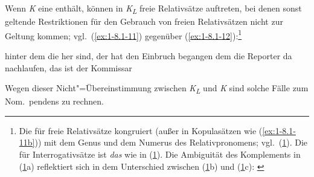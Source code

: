 \documentclass[output=paper]{langsci/langscibook}
\begin{document}
Wenn \textit{K} eine  enthält, können in \textit{K\textsubscript{L}} freie Relativsätze auftreten, bei
denen sonst geltende Restriktionen für den Gebrauch von freien Relativsätzen nicht
zur Geltung kommen; vgl.\ (\ref{ex:1-8.1-11}) gegenüber
(\ref{ex:1-8.1-12}):\footnote{%
	Die  für freie Relativsätze
  kongruiert (außer in Kopulasätzen wie (\ref{ex:1-8.1-11b})) mit dem
  Genus und dem Numerus des Relativpronomens;
  vgl.\ (\ref{ex:1-fn33i}). Die  für Interrogativsätze ist
  \textit{das} wie in (\ref{ex:1-fn33ii}). Die Ambiguität des
  Komplements in (\ref{ex:1-fn33iii}a) reflektiert sich in dem
  Unterschied zwischen (\ref{ex:1-fn33iii}b) und
  (\ref{ex:1-fn33iii}c):
  \eal
  \label{ex:1-fn33i}%
  \zlmid
  \eal
  \label{ex:1-fn33ii}
  \zlmid\vspace{-1mm}%
  \eal%
  \label{ex:1-fn33iii}
  \zllast%
}
\begin{exe}
\ex\label{ex:1-8.1-11}
\begin{xlist}
\ex\label{ex:1-8.1-11a} hinter dem die her sind, der hat den Einbruch begangen
\ex\label{ex:1-8.1-11b} dem die Reporter da nachlaufen, das ist der Kommissar
\end{xlist}
\end{exe}
\begin{exe}
\ex\label{ex:1-8.1-12}
\begin{xlist}
\end{xlist}
\end{exe}
Wegen dieser Nicht"=Übereinstimmung zwischen \textit{K\textsubscript{L}} und \textit{K} sind solche Fälle zum
Nom.\ pendens zu rechnen.
\end{document}
